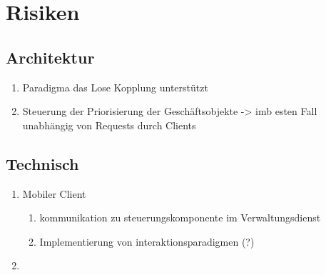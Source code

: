 \chapter{Risiken}

\begin{comment}
Risiken können Ereignisse sein, die den Projektverlauf auf eine bestimmte Art und Weise gefährden könnten. Relevant sind dabei projektspezifische Risiken. Es ist wichtig sie vorab zu identifizieren und entsprechende Maßnahmen zu planen, um dieses Risiko zu minimieren bzw. den Umgang zu beschreiben, falls dieses Risiko auftritt. Technische Risiken sollten mit Hilfe eines Proof of Concept minimiert werden. Dementsprechend ist es wichtig zu beschreiben wie die Risiken mit einem PoC adressiert werden. 
\end{comment}



%
\section{Architektur}
\begin{enumerate}
\item Paradigma das Lose Kopplung unterstützt 
\item Steuerung der Priorisierung der Geschäftsobjekte
-> imb esten Fall unabhängig von Requests durch Clients
\end{enumerate}

%
\section{Technisch}
\begin{enumerate}
\item Mobiler Client
\begin{enumerate}
\item kommunikation zu steuerungskomponente im Verwaltungsdienst
\item Implementierung von interaktionsparadigmen (?)
\end{enumerate}
\item 
\end{enumerate}





